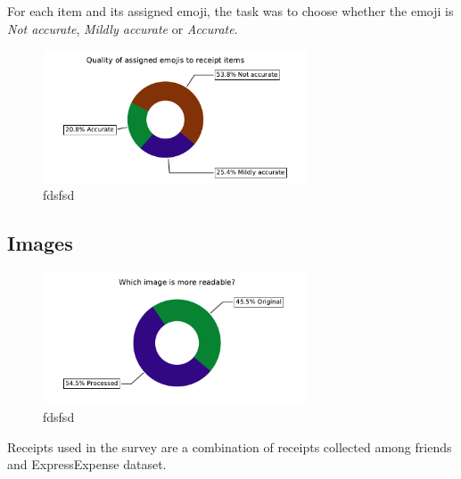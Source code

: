 \documentclass[
  digital, %
  table,   %
  oneside, %
  lof,     %
  lot,     %
]{fithesis3}
\begin{document}
For each item and its assigned emoji, the task was to choose whether the emoji is \textit{Not accurate}, \textit{Mildly accurate} or \textit{Accurate}.

\begin{figure}
    \begin{center}
        \includegraphics[width=0.7\textwidth]{figures/graphs/quality_of_emojis}
    \end{center}
    \caption{fdsfsd}
    \label{fig:quality_of_emojis}
\end{figure}

\subsection{Images}

\begin{figure}
    \begin{center}
        \includegraphics[width=0.7\textwidth]{figures/graphs/which_image_is_more_readable}
    \end{center}
    \caption{fdsfsd}
    \label{fig:which_image_is_more_readable}
\end{figure}


Receipts used in the survey are a combination of receipts collected among friends and ExpressExpense \cite{ExpressExpense2019} dataset.
\end{document}
